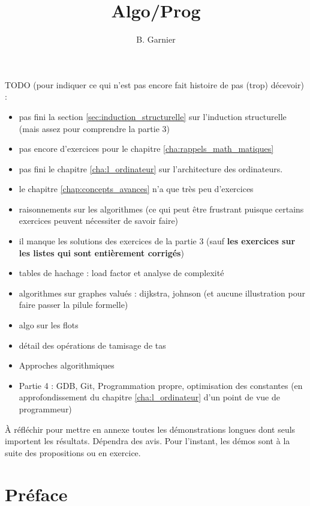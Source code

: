 \documentclass{minitelreport}
\begin{document}
	\title{Algo/Prog}
	\author{
		B. Garnier
	}
	\maketitle
\begin{refsection} %
TODO (pour indiquer ce qui n'est pas encore fait histoire de pas (trop) décevoir) :
\begin{itemize}
	\item pas fini la section \ref{sec:induction_structurelle} sur l'induction structurelle (mais assez pour comprendre la partie 3)
	\item pas encore d'exercices pour le chapitre \ref{cha:rappels_math_matiques}
	\item pas fini le chapitre \ref{cha:l_ordinateur} sur l'architecture des ordinateurs.
	\item le chapitre \ref{chap:concepts_avances} n'a que très peu d'exercices
	\item raisonnements sur les algorithmes (ce qui peut être frustrant puisque certains exercices peuvent nécessiter de savoir faire)
	\item il manque les solutions des exercices de la partie 3 (sauf \textbf{les exercices sur les listes qui sont entièrement corrigés})
	\item tables de hachage : load factor et analyse de complexité 
	\item algorithmes sur graphes valués : dijkstra, johnson (et aucune illustration pour faire passer la pilule formelle)
	\item algo sur les flots
	\item détail des opérations de tamisage de tas
	\item Approches algorithmiques
	\item Partie 4 : GDB, Git, Programmation propre, optimisation des constantes (en approfondissement du chapitre \ref{cha:l_ordinateur} d'un point de vue de programmeur)
\end{itemize}
À réfléchir pour mettre en annexe toutes les démonstrations longues dont seuls importent les résultats. Dépendra des avis. Pour l'instant, les démos sont à la suite des propositions ou en exercice.
\section*{Préface}

\tableofcontents
\listofdefinition
\listoftables
\newpage

\end{refsection}
\end{document}
